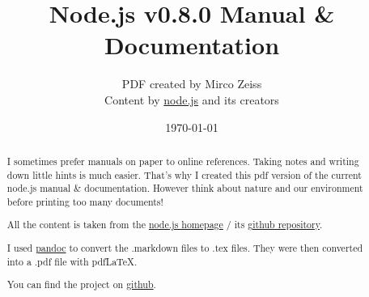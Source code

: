 \documentclass[10pt, a4paper, titlepage, oneside, plain]{article}
\begin{document}
	\title{Node.js v0.8.0 Manual \& Documentation}
	\author{PDF created by Mirco Zeiss\\Content by \href{http://www.nodejs.org}{node.js} and its creators}
	\date{\today}

	\maketitle

	\begin{abstract}
		I sometimes prefer manuals on paper to online references. Taking notes and writing down little hints is much easier. That's why I created this pdf version of the current node.js manual \& documentation. However think about nature and our environment before printing too many documents!

	All the content is taken from the \href{http://www.nodejs.org}{node.js homepage} / its \href{https://github.com/joyent/node}{github repository}.

	I used \href{http://johnmacfarlane.net/pandoc/}{pandoc} to convert the .markdown files to .tex files. They were then converted into a .pdf file with pdfLaTeX.

	You can find the project on \href{https://github.com/zeMirco/nodejs-pdf-docs}{github}.
	\end{abstract}

	\tableofcontents

	
	
	
	
	
	
	
	
	
	
	
	
	
	
				
	
					
	
	
	
	
	
	
	
	
	
	\appendix
		
\end{document}

